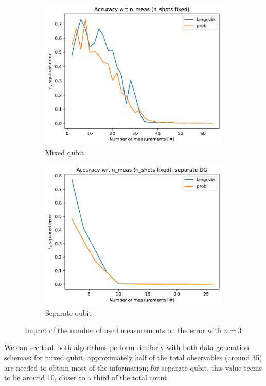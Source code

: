 \documentclass[12pt]{memoir}
\begin{document}
\begin{figure}[H]
    \centering
    \begin{subfigure}[b]{0.49\textwidth}
        \centering
        \includegraphics[width=\textwidth]{figures/experiments/meas/meas_acc_comp_meas-1.png}
        \caption{Mixed qubit}
        \label{fig:meas-comp-mixed-sub}
    \end{subfigure}
    \hfill
    \begin{subfigure}[b]{0.49\textwidth}
        \centering
        \includegraphics[width=\textwidth]{figures/experiments/meas/meas_acc_comp_meas_sep-1.png}
        \caption{Separate qubit}
        \label{fig:meas-comp-sep-sub}
    \end{subfigure}
    \caption{Impact of the number of used measurements on the error with $n=3$}
    \label{fig:meas-comp}
\end{figure}
We can see that both algorithms perform similarly with both data generation schemas: for mixed qubit, approximately half of the total observables (around 35) are needed to obtain most of the information; for separate qubit, this value seems to be around 10, closer to a third of the total count.\medbreak 
\end{document}
